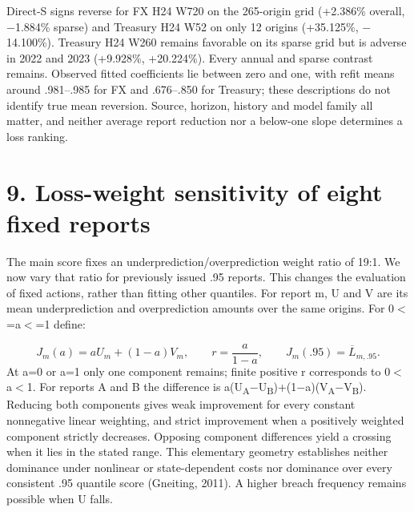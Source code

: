 \documentclass[10pt,a4paper]{article}
\begin{document}
Direct-S signs reverse for FX H24 W720 on the 265-origin grid (+2.386\% overall, \(-\)1.884\% sparse) and Treasury H24 W52 on only 12 origins (+35.125\%, \(-\)14.100\%). Treasury H24 W260 remains favorable on its sparse grid but is adverse in 2022 and 2023 (+9.928\%, +20.224\%). Every annual and sparse contrast remains. Observed fitted coefficients lie between zero and one, with refit means around .981–.985 for FX and .676–.850 for Treasury; these descriptions do not identify true mean reversion. Source, horizon, history and model family all matter, and neither average report reduction nor a below-one slope determines a loss ranking.

\section*{9. Loss-weight sensitivity of eight fixed reports}
The main score fixes an underprediction/overprediction weight ratio of 19:1. We now vary that ratio for previously issued .95 reports. This changes the evaluation of fixed actions, rather than fitting other quantiles. For report m, U and V are its mean underprediction and overprediction amounts over the same origins. For 0\( < \)=a\( < \)=1 define:

\[
J_m(a)=aU_m+(1-a)V_m,\qquad r=\frac{a}{1-a},\qquad J_m(.95)=\overline L_{m,.95}.
\]
At a=0 or a=1 only one component remains; finite positive r corresponds to 0\( < \)a\( < \)1. For reports A and B the difference is a(U\textsubscript{A}\(-\)U\textsubscript{B})+(1\(-\)a)(V\textsubscript{A}\(-\)V\textsubscript{B}). Reducing both components gives weak improvement for every constant nonnegative linear weighting, and strict improvement when a positively weighted component strictly decreases. Opposing component differences yield a crossing when it lies in the stated range. This elementary geometry establishes neither dominance under nonlinear or state-dependent costs nor dominance over every consistent .95 quantile score (Gneiting, 2011). A higher breach frequency remains possible when U falls.
\end{document}
